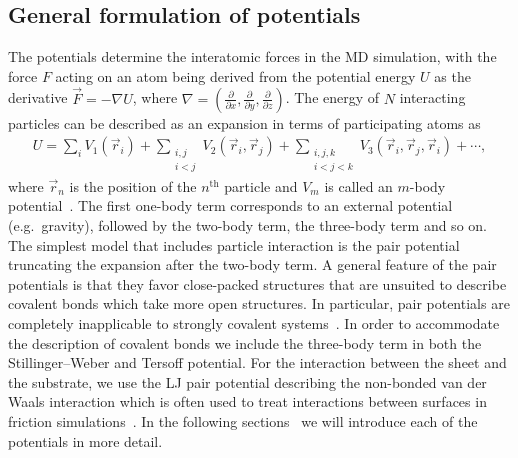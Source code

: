 \subsection{General formulation of potentials}
The potentials determine the interatomic forces in the \acrshort{MD} simulation, with the force $F$ acting on an atom being derived from the potential energy $U$ as the derivative $\vec{F} = -\nabla U$, where $\nabla = (\frac{\partial}{\partial x}, \frac{\partial}{\partial y}, \frac{\partial}{\partial z})$. The energy of $N$ interacting particles can be described as an expansion in terms of participating atoms as 
\begin{align*}
  U = \sum_i V_1(\vec{r}_i) + 
      \sum_{\substack{i, j \\ i < j}} V_2(\vec{r}_i, \vec{r}_j) +  
      \sum_{\substack{i,j,k \\ i < j < k}} V_3(\vec{r}_i, \vec{r}_j, \vec{r}_i) + \cdots,
\end{align*} 
where $\vec{r}_n$ is the position of the $n^{\text{th}}$ particle and $V_m$ is called an $m$-body potential~\cite{PhysRevB.37.6991}. The first one-body term corresponds
to an external potential (e.g.\ gravity), followed by the two-body term, the
three-body term and so on. The simplest model that includes particle interaction
is the pair potential truncating the expansion after the two-body term. A general feature of the pair potentials is that they favor close-packed
structures that are unsuited to describe covalent bonds which take more open
structures. In particular, pair potentials are completely inapplicable to
strongly covalent systems~\cite{PhysRevB.37.6991}. In order to accommodate the
description of covalent bonds we include the three-body term in both the Stillinger–Weber and Tersoff potential. For the interaction between the sheet and the substrate, we use the \acrshort{LJ} pair potential describing the non-bonded van der Waals interaction which is often used to treat interactions between surfaces in friction simulations~\cite{zhu_study_2018,ZHANG201585,Yoon2015MolecularDS,kim_nano-scale_2009}. In the following sections~ we will introduce each of the potentials in more detail.


